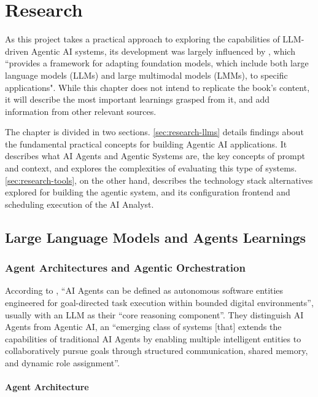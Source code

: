 \documentclass[a4paper]{report}
\begin{document}
\chapter{Research}
\label{chapter:research}

As this project takes a practical approach to exploring the capabilities of LLM-driven Agentic AI systems, its development was largely influenced by \cite{aiebook2025}, which ``provides a framework for adapting foundation models, which include both large language models (LLMs) and large multimodal models (LMMs), to specific applications". While this chapter does not intend to replicate the book's content, it will describe the most important learnings grasped from it, and add information from other relevant sources.

The chapter is divided in two sections. \autoref{sec:research-llms} details findings about the fundamental practical concepts for building Agentic AI applications. It describes what AI Agents and Agentic Systems are, the key concepts of prompt and context, and explores the complexities of evaluating this type of systems. \autoref{sec:research-tools}, on the other hand, describes the technology stack alternatives explored for building the agentic system, and its configuration frontend and scheduling execution of the AI Analyst.

\section{Large Language Models and Agents Learnings}
\label{sec:research-llms}

\subsection{Agent Architectures and Agentic Orchestration}

According to \cite{sapkota2025aiagentsvsagentic}, ``AI Agents can be defined as autonomous software entities engineered for goal-directed task execution within bounded digital environments'', usually with an LLM as their ``core reasoning component''. They distinguish AI Agents from Agentic AI, an ``emerging class of systems [that] extends the capabilities of traditional AI Agents by enabling multiple intelligent entities to collaboratively pursue goals through structured communication, shared memory, and dynamic role assignment''.

\subsubsection{Agent Architecture}
\end{document}

